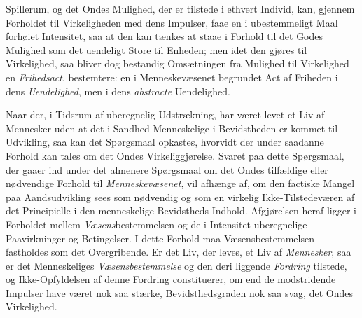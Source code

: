 Spillerum, og det Ondes Mulighed, der er tilstede i ethvert Individ, kan, gjennem
Forholdet til Virkeligheden med dens Impulser, faae en i ubestemmeligt Maal
forhøiet Intensitet, saa at den kan tænkes at staae i Forhold til det Godes
Mulighed som det uendeligt
 Store til Enheden; men idet den gjøres til Virkelighed, saa bliver dog bestandig
Omsætningen fra Mulighed til Virkelighed en \emph{Frihedsact}, bestemtere: en i
Menneskevæsenet begrundet Act af Friheden i dens \emph{Uendelighed}, men i dens
\emph{abstracte} Uendelighed.

Naar der, i Tidsrum af uberegnelig Udstrækning, har været levet et Liv af
Mennesker uden at det i Sandhed Menneskelige i Bevidstheden er kommet til
Udvikling, saa kan det Spørgsmaal opkastes, hvorvidt der under saadanne Forhold
kan tales om det Ondes Virkeliggjørelse. Svaret paa dette Spørgsmaal, der gaaer
ind under det almenere Spørgsmaal om det Ondes tilfældige eller nødvendige
Forhold til \emph{Menneskevæsenet}, vil afhænge af, om den factiske Mangel paa
Aandsudvikling sees som nødvendig og som en virkelig Ikke-Tilstedeværen af det
Principielle i den menneskelige Bevidstheds Indhold. Afgjørelsen heraf ligger i
Forholdet mellem \emph{Væsens}bestemmelsen og de i Intensitet uberegnelige
Paavirkninger og Betingelser. I dette Forhold maa Væsensbestemmelsen fastholdes
som det Overgribende. Er det Liv, der leves, et Liv af \emph{Mennesker}, saa er
det Menneskeliges \emph{Væsensbestemmelse} og den deri liggende \emph{Fordring}
tilstede, og Ikke-Opfyldelsen af denne Fordring constituerer, om end de
modstridende Impulser have været nok saa stærke, Bevidsthedsgraden nok saa svag,
det Ondes Virkelighed.

